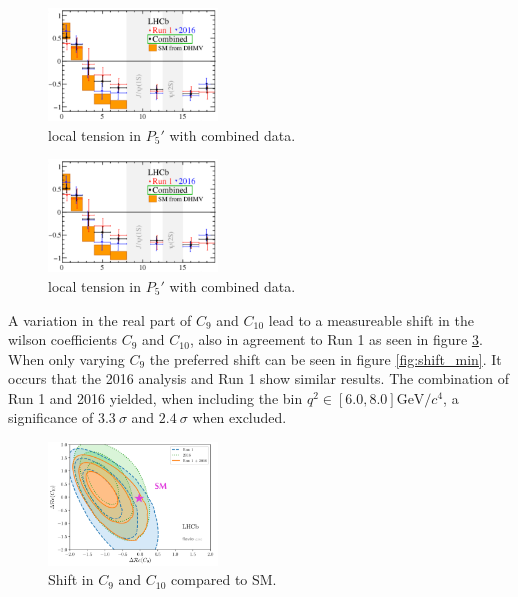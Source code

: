 \begin{figure}[htb]
  \centering
  \includegraphics[width=0.4\textwidth]{flavor_plots/p5_tension_after.png}
  \caption{local tension in $P_5\prime$ with combined data.}
  \label{fig:p5normal}
\end{figure}
\begin{figure}[htb]
  \centering
  \includegraphics[width=0.4\textwidth]{flavor_plots/p5_tension_after.png}
  \caption{local tension in $P_5\prime$ with combined data.}
  \label{fig:p5_after}
\end{figure}

A variation in the real part of $C_9$ and $C_{10}$ lead to a measureable shift in the wilson coefficients $C_9$ and $C_{10}$, also in agreement to Run 1 as seen in figure \ref{fig:c9c10}.
When only varying $C_9$ the preferred shift can be seen in figure \ref{fig:shift_min}.
It occurs that the 2016 analysis and Run 1 show similar results.
The combination of Run 1 and 2016 yielded, when including the bin
$q^2 \in [6.0, 8.0]\text{GeV}/c^4$, a significance of $\SI{3.3}{\sigma}$ and $\SI{2.4}{\sigma}$ when excluded.
\begin{figure}
  \centering
  \includegraphics[width=0.4\textwidth]{flavor_plots/shiftc9c10.png}
  \caption{Shift in $C_9$ and $C_{10}$ compared to SM.}
  \label{fig:c9c10}
\end{figure}

